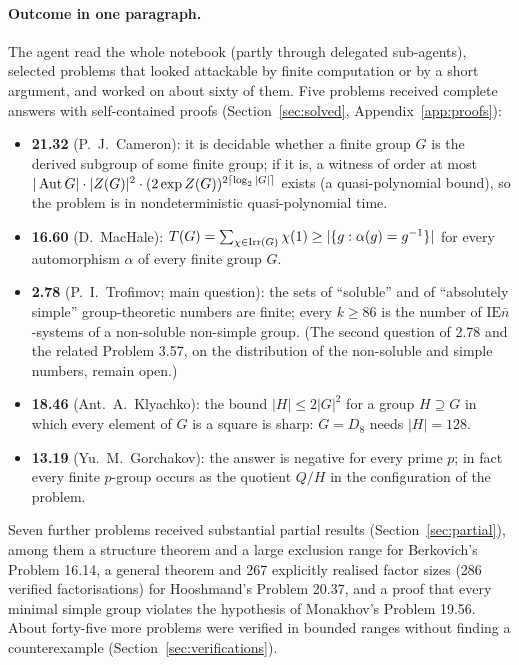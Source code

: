 \paragraph{Outcome in one paragraph.}
The agent read the whole notebook (partly through delegated sub-agents), selected problems that looked
attackable by finite computation or by a short argument, and worked on about sixty of them. Five problems received
complete answers with self-contained proofs (Section~\ref{sec:solved}, Appendix~\ref{app:proofs}):
\begin{itemize}
\item \textbf{21.32} (P.~J.~Cameron): it is decidable whether a finite group $G$ is the derived subgroup of some
finite group; if it is, a witness of order at most $|\operatorname{Aut} G|\cdot|Z(G)|^2\cdot(2\exp Z(G))^{2\lceil\log_2|G|\rceil}$
exists (a quasi-polynomial bound), so the problem is in nondeterministic quasi-polynomial time.
\item \textbf{16.60} (D.~MacHale): $T(G)=\sum_{\chi\in\operatorname{Irr}(G)}\chi(1)\ge |\{g : \alpha(g)=g^{-1}\}|$ for every
automorphism $\alpha$ of every finite group $G$.
\item \textbf{2.78} (P.~I.~Trofimov; main question): the sets of ``soluble'' and of ``absolutely simple''
group-theoretic numbers are finite; every $k\ge 86$ is the number of $\mathrm{IE}\bar{n}$-systems of a non-soluble
non-simple group. (The second question of 2.78 and the related Problem 3.57, on the distribution of the
non-soluble and simple numbers, remain open.)
\item \textbf{18.46} (Ant.~A.~Klyachko): the bound $|H|\le 2|G|^2$ for a group $H\supseteq G$ in which every
element of $G$ is a square is sharp: $G=D_8$ needs $|H|=128$.
\item \textbf{13.19} (Yu.~M.~Gorchakov): the answer is negative for every prime $p$; in fact every finite
$p$-group occurs as the quotient $Q/H$ in the configuration of the problem.
\end{itemize}
Seven further problems received substantial partial results (Section~\ref{sec:partial}), among them a
structure theorem and a large exclusion range for Berkovich's Problem 16.14, a general theorem and 267 explicitly
realised factor sizes (286 verified factorisations) for Hooshmand's Problem 20.37, and a proof that every minimal simple group violates the hypothesis
of Monakhov's Problem 19.56. About forty-five more problems were
verified in bounded ranges without finding a counterexample (Section~\ref{sec:verifications}).

